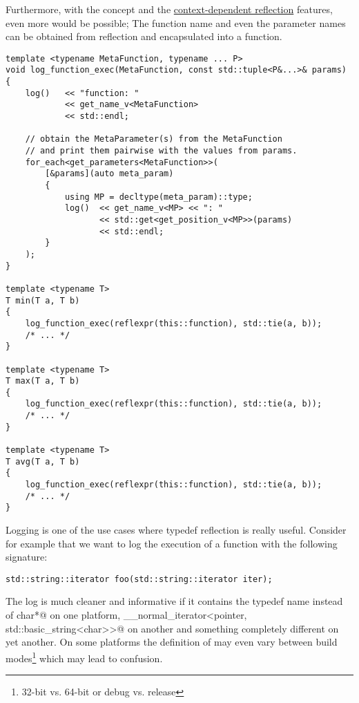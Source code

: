 Furthermore, with the  concept and the
\hyperref[context-dependent-reflection]{context-dependent reflection} features,
even more would be possible; The function name and even the parameter names can
be obtained from reflection and encapsulated into a function.

\begin{verbatim}
template <typename MetaFunction, typename ... P>
void log_function_exec(MetaFunction, const std::tuple<P&...>& params)
{
	log()   << "function: "
	        << get_name_v<MetaFunction>
	        << std::endl;

	// obtain the MetaParameter(s) from the MetaFunction
	// and print them pairwise with the values from params.
	for_each<get_parameters<MetaFunction>>(
		[&params](auto meta_param)
		{
			using MP = decltype(meta_param)::type;
			log()  << get_name_v<MP> << ": "
			       << std::get<get_position_v<MP>>(params)
			       << std::endl;
		}
	);
}

template <typename T>
T min(T a, T b)
{
	log_function_exec(reflexpr(this::function), std::tie(a, b));
	/* ... */
}

template <typename T>
T max(T a, T b)
{
	log_function_exec(reflexpr(this::function), std::tie(a, b));
	/* ... */
}

template <typename T>
T avg(T a, T b)
{
	log_function_exec(reflexpr(this::function), std::tie(a, b));
	/* ... */
}
\end{verbatim}

Logging is one of the use cases where typedef reflection is really useful.
Consider for example that we want to log the execution of a function with
the following signature:

\begin{verbatim}
std::string::iterator foo(std::string::iterator iter);
\end{verbatim}

The log is much cleaner and informative if it contains the typedef name
\verb@iterator@ instead of \verb@const char*@ on one platform,
\verb@__normal_iterator<pointer, std::basic_string<char>>@ on another and
something completely different on yet another. On some platforms the definition
of \verb@iterator@ may even vary between build modes\footnote{32-bit vs. 64-bit or 
debug vs. release} which may lead to confusion.

